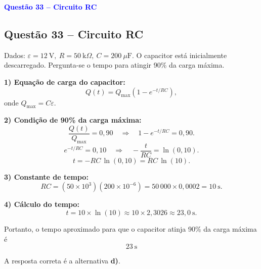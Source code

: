 \begin{flushleft}
\textbf{\textcolor{blue}{\Large Quest\~ao 33 -- Circuito RC}}\\

\subsection{Quest\~ao 33 -- Circuito RC}

\noindent Dados: \(\varepsilon = 12\ \text{V},\ R = 50\ \text{k}\Omega,\ C = 200\ \mu\text{F}\). O capacitor est\'a inicialmente 
descarregado. Pergunta-se o tempo para atingir 90\% da carga m\'axima.

\bigskip

\textbf{1) Equa\c{c}\~ao de carga do capacitor:}
\[
Q(t) = Q_{\max}\left(1 - e^{-t/RC}\right),
\]
onde \(Q_{\max} = C\varepsilon\).

\bigskip

\textbf{2) Condi\c{c}\~ao de 90\% da carga m\'axima:}
\[
\frac{Q(t)}{Q_{\max}} = 0{,}90 \quad \Rightarrow \quad 1 - e^{-t/RC} = 0{,}90.
\]
\[
e^{-t/RC} = 0{,}10 \quad \Rightarrow \quad -\frac{t}{RC} = \ln(0{,}10).
\]
\[
t = -RC\,\ln(0{,}10) = RC\,\ln(10).
\]

\bigskip

\textbf{3) Constante de tempo:}
\[
RC = (50\times 10^3)(200\times 10^{-6})
= 50\,000 \times 0{,}0002 = 10\ \text{s}.
\]

\bigskip

\textbf{4) C\'alculo do tempo:}
\[
t = 10 \times \ln(10) \approx 10 \times 2{,}3026 \approx 23{,}0\ \text{s}.
\]

\bigskip

\noindent Portanto, o tempo aproximado para que o capacitor atinja 90\% da carga m\'axima \'e
\[
\boxed{23\ \text{s}}
\]

\noindent A resposta correta é a alternativa \colorbox{green!50}{\textbf{d)}}.
\end{flushleft}


%
%
%
%
%
